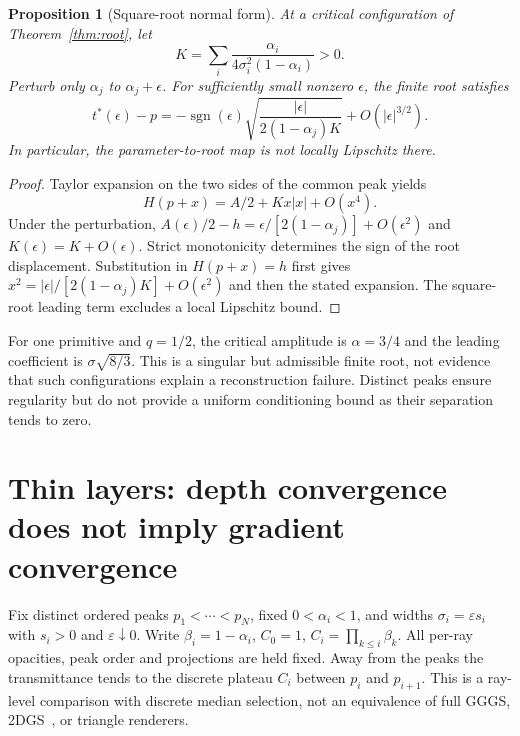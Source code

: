 \documentclass[11pt,a4paper]{article}
\newtheorem{proposition}[theorem]{Proposition}
\newcommand{\sgn}{\operatorname{sgn}}
\begin{document}
\begin{proposition}[Square-root normal form]
At a critical configuration of Theorem~\ref{thm:root}, let
\[
 K=\sum_i\frac{\alpha_i}{4\sigma_i^2(1-\alpha_i)}>0.
\]
Perturb only $\alpha_j$ to $\alpha_j+\epsilon$. For sufficiently small
nonzero $\epsilon$, the finite root satisfies
\[
 t^*(\epsilon)-p=
 -\sgn(\epsilon)\sqrt{\frac{|\epsilon|}{2(1-\alpha_j)K}}
 +O(|\epsilon|^{3/2}).
\]
In particular, the parameter-to-root map is not locally Lipschitz there.
\end{proposition}
\begin{proof}
Taylor expansion on the two sides of the common peak yields
\[
 H(p+x)=A/2+Kx|x|+O(x^4).
\]
Under the perturbation,
$A(\epsilon)/2-h=\epsilon/[2(1-\alpha_j)]+O(\epsilon^2)$ and
$K(\epsilon)=K+O(\epsilon)$. Strict monotonicity determines the sign of the
root displacement. Substitution in $H(p+x)=h$ first gives
$x^2=|\epsilon|/[2(1-\alpha_j)K]+O(\epsilon^2)$ and then the stated expansion.
The square-root leading term excludes a local Lipschitz bound.
\end{proof}

For one primitive and $q=1/2$, the critical amplitude is $\alpha=3/4$ and the
leading coefficient is $\sigma\sqrt{8/3}$. This is a singular but admissible
finite root, not evidence that such configurations explain a reconstruction
failure. Distinct peaks ensure regularity but do not provide a uniform
conditioning bound as their separation tends to zero.

\section{Thin layers: depth convergence does not imply gradient convergence}
Fix distinct ordered peaks $p_1<\cdots<p_N$, fixed $0<\alpha_i<1$,
and widths $\sigma_i=\varepsilon s_i$ with $s_i>0$ and $\varepsilon\downarrow0$.
Write $\beta_i=1-\alpha_i$, $C_0=1$, $C_i=\prod_{k\le i}\beta_k$.
All per-ray opacities, peak order and projections are held fixed.
Away from the peaks the transmittance tends to the discrete plateau
$C_i$ between $p_i$ and $p_{i+1}$.
This is a ray-level comparison with discrete median selection,
not an equivalence of full GGGS, 2DGS~\cite{twodgs}, or triangle renderers.
\end{document}
